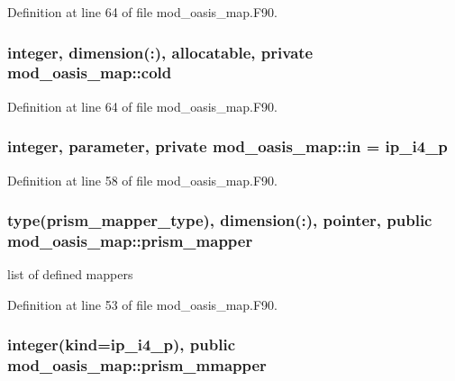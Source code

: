 Definition at line 64 of file mod\+\_\+oasis\+\_\+map.\+F90.

\hypertarget{classmod__oasis__map_a479ecc5b0be5d1adf3973cb08c40d30a}{
\subsubsection[{cold}]{\setlength{\rightskip}{0pt plus 5cm}integer, dimension(\+:), allocatable, private mod\+\_\+oasis\+\_\+map\+::cold\hspace{0.3cm}{\ttfamily [private]}}}\label{classmod__oasis__map_a479ecc5b0be5d1adf3973cb08c40d30a}


Definition at line 64 of file mod\+\_\+oasis\+\_\+map.\+F90.

\hypertarget{classmod__oasis__map_aa58997467050224f6db2bc93fe5f7ca1}{
\subsubsection[{in}]{\setlength{\rightskip}{0pt plus 5cm}integer, parameter, private mod\+\_\+oasis\+\_\+map\+::in = ip\+\_\+i4\+\_\+p\hspace{0.3cm}{\ttfamily [private]}}}\label{classmod__oasis__map_aa58997467050224f6db2bc93fe5f7ca1}


Definition at line 58 of file mod\+\_\+oasis\+\_\+map.\+F90.

\hypertarget{classmod__oasis__map_a00ad53f61b6998938fca792455487f7e}{
\subsubsection[{prism\+\_\+mapper}]{\setlength{\rightskip}{0pt plus 5cm}type({\bf prism\+\_\+mapper\+\_\+type}), dimension(\+:), pointer, public mod\+\_\+oasis\+\_\+map\+::prism\+\_\+mapper}}\label{classmod__oasis__map_a00ad53f61b6998938fca792455487f7e}


list of defined mappers 



Definition at line 53 of file mod\+\_\+oasis\+\_\+map.\+F90.

\hypertarget{classmod__oasis__map_ab15f72e9f33a67181edc977c06b951e2}{
\subsubsection[{prism\+\_\+mmapper}]{\setlength{\rightskip}{0pt plus 5cm}integer(kind=ip\+\_\+i4\+\_\+p), public mod\+\_\+oasis\+\_\+map\+::prism\+\_\+mmapper}}\label{classmod__oasis__map_ab15f72e9f33a67181edc977c06b951e2}


